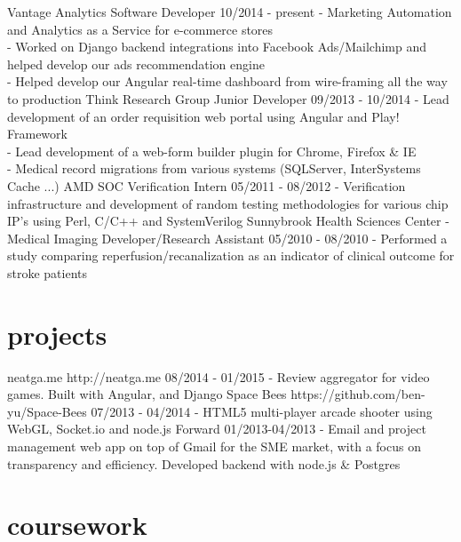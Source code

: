 \documentclass[]{friggeri-cv}
\begin{document}
\begin{entrylist}
  \entry
    {Vantage Analytics}
    {Software Developer}
    {10/2014 - present}
    {- Marketing Automation and Analytics as a Service for e-commerce stores\\
     - Worked on Django backend integrations into Facebook Ads/Mailchimp and helped develop our ads recommendation engine\\
     - Helped develop our Angular real-time dashboard from wire-framing all the way to production}
  \entry
    {Think Research Group}
    {Junior Developer}
    {09/2013 - 10/2014}
    {- Lead development of an order requisition web portal using Angular and Play! Framework\\
     - Lead development of a web-form builder plugin for Chrome, Firefox \& IE\\
     - Medical record migrations from various systems (SQLServer, InterSystems Cache ...)}
  \entry
    {AMD}
    {SOC Verification Intern}
    {05/2011 - 08/2012}
    {- Verification infrastructure and development of random testing methodologies for various chip IP’s using Perl, C/C++ and SystemVerilog}
  \entry
    {Sunnybrook Health Sciences Center - Medical Imaging}
    {Developer/Research Assistant}
    {05/2010 - 08/2010}
    {- Performed a study comparing reperfusion/recanalization as an indicator of clinical outcome for stroke patients}
\end{entrylist}

\section{projects}

\begin{entrylist}
  \entry
    {neatga.me}
    {http://neatga.me}
    {08/2014 - 01/2015}
    {- Review aggregator for video games. Built with Angular, and Django}
  \entry
    {Space Bees}
    {https://github.com/ben-yu/Space-Bees}
    {07/2013 - 04/2014}
    {- HTML5 multi-player arcade shooter using WebGL, Socket.io and node.js}
  \entry
    {Forward}
    {}
    {01/2013-04/2013}
    {- Email and project management web app on top of Gmail for the SME market, with a focus on transparency and efficiency. Developed backend with node.js \& Postgres}
\end{entrylist}

\section{coursework}
\end{document}
